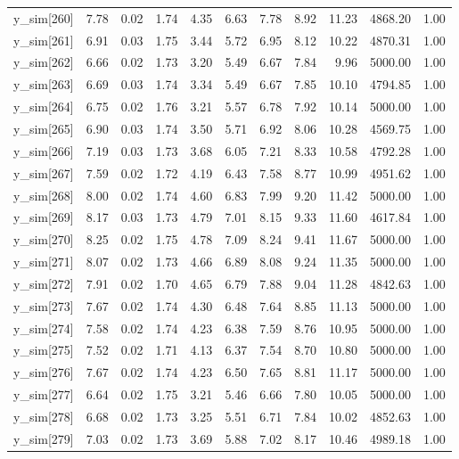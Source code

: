 \begin{table}[ht]
\begin{tabular}{rrrrrrrrrrr}
  y\_sim[260] & 7.78 & 0.02 & 1.74 & 4.35 & 6.63 & 7.78 & 8.92 & 11.23 & 4868.20 & 1.00 \\ 
  y\_sim[261] & 6.91 & 0.03 & 1.75 & 3.44 & 5.72 & 6.95 & 8.12 & 10.22 & 4870.31 & 1.00 \\ 
  y\_sim[262] & 6.66 & 0.02 & 1.73 & 3.20 & 5.49 & 6.67 & 7.84 & 9.96 & 5000.00 & 1.00 \\ 
  y\_sim[263] & 6.69 & 0.03 & 1.74 & 3.34 & 5.49 & 6.67 & 7.85 & 10.10 & 4794.85 & 1.00 \\ 
  y\_sim[264] & 6.75 & 0.02 & 1.76 & 3.21 & 5.57 & 6.78 & 7.92 & 10.14 & 5000.00 & 1.00 \\ 
  y\_sim[265] & 6.90 & 0.03 & 1.74 & 3.50 & 5.71 & 6.92 & 8.06 & 10.28 & 4569.75 & 1.00 \\ 
  y\_sim[266] & 7.19 & 0.03 & 1.73 & 3.68 & 6.05 & 7.21 & 8.33 & 10.58 & 4792.28 & 1.00 \\ 
  y\_sim[267] & 7.59 & 0.02 & 1.72 & 4.19 & 6.43 & 7.58 & 8.77 & 10.99 & 4951.62 & 1.00 \\ 
  y\_sim[268] & 8.00 & 0.02 & 1.74 & 4.60 & 6.83 & 7.99 & 9.20 & 11.42 & 5000.00 & 1.00 \\ 
  y\_sim[269] & 8.17 & 0.03 & 1.73 & 4.79 & 7.01 & 8.15 & 9.33 & 11.60 & 4617.84 & 1.00 \\ 
  y\_sim[270] & 8.25 & 0.02 & 1.75 & 4.78 & 7.09 & 8.24 & 9.41 & 11.67 & 5000.00 & 1.00 \\ 
  y\_sim[271] & 8.07 & 0.02 & 1.73 & 4.66 & 6.89 & 8.08 & 9.24 & 11.35 & 5000.00 & 1.00 \\ 
  y\_sim[272] & 7.91 & 0.02 & 1.70 & 4.65 & 6.79 & 7.88 & 9.04 & 11.28 & 4842.63 & 1.00 \\ 
  y\_sim[273] & 7.67 & 0.02 & 1.74 & 4.30 & 6.48 & 7.64 & 8.85 & 11.13 & 5000.00 & 1.00 \\ 
  y\_sim[274] & 7.58 & 0.02 & 1.74 & 4.23 & 6.38 & 7.59 & 8.76 & 10.95 & 5000.00 & 1.00 \\ 
  y\_sim[275] & 7.52 & 0.02 & 1.71 & 4.13 & 6.37 & 7.54 & 8.70 & 10.80 & 5000.00 & 1.00 \\ 
  y\_sim[276] & 7.67 & 0.02 & 1.74 & 4.23 & 6.50 & 7.65 & 8.81 & 11.17 & 5000.00 & 1.00 \\ 
  y\_sim[277] & 6.64 & 0.02 & 1.75 & 3.21 & 5.46 & 6.66 & 7.80 & 10.05 & 5000.00 & 1.00 \\ 
  y\_sim[278] & 6.68 & 0.02 & 1.73 & 3.25 & 5.51 & 6.71 & 7.84 & 10.02 & 4852.63 & 1.00 \\ 
  y\_sim[279] & 7.03 & 0.02 & 1.73 & 3.69 & 5.88 & 7.02 & 8.17 & 10.46 & 4989.18 & 1.00 \\ 

\end{tabular}
\end{table}
